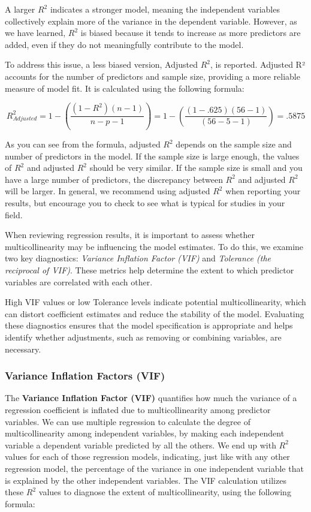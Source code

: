\documentclass[
  letterpaper,
  DIV=11,
  numbers=noendperiod]{scrreprt}
\begin{document}
A larger \(R^2\) indicates a stronger model, meaning the independent
variables collectively explain more of the variance in the dependent
variable. However, as we have learned, \(R^2\) is biased because it
tends to increase as more predictors are added, even if they do not
meaningfully contribute to the model.

To address this issue, a less biased version, Adjusted \(R^2\), is
reported. Adjusted R² accounts for the number of predictors and sample
size, providing a more reliable measure of model fit. It is calculated
using the following formula:

\[
R^2_{Adjusted} = 1 - \left( \frac{(1-R^2)(n-1)}{n-p-1} \right) 
= 1 - \left( \frac{(1- .625)(56-1)}{(56-5-1)} \right) = .5875
\]

As you can see from the formula, adjusted \(R^2\) depends on the sample
size and number of predictors in the model. If the sample size is large
enough, the values of \(R^2\) and adjusted \(R^2\) should be very
similar. If the sample size is small and you have a large number of
predictors, the discrepancy between \(R^2\) and adjusted \(R^2\) will be
larger. In general, we recommend using adjusted \(R^2\) when reporting
your results, but encourage you to check to see what is typical for
studies in your field.\,\,

When reviewing regression results, it is important to assess whether
multicollinearity may be influencing the model estimates. To do this, we
examine two key diagnostics: \emph{Variance Inflation Factor (VIF)} and
\emph{Tolerance (the reciprocal of VIF)}. These metrics help determine
the extent to which predictor variables are correlated with each other.

High VIF values or low Tolerance levels indicate potential
multicollinearity, which can distort coefficient estimates and reduce
the stability of the model. Evaluating these diagnostics ensures that
the model specification is appropriate and helps identify whether
adjustments, such as removing or combining variables, are necessary.

\subsubsection*{Variance Inflation Factors
(VIF)\,}\label{variance-inflation-factors-vif}

The \textbf{Variance Inflation Factor (VIF)} quantifies how much the
variance of a regression coefficient is inflated due to
multicollinearity among predictor variables. We can use multiple
regression to calculate the degree of multicollinearity among
independent variables, by making each independent variable a dependent
variable predicted by all the others. We end up with \(R^2\) values for
each of those regression models, indicating, just like with any other
regression model, the percentage of the variance in one independent
variable that is explained by the other independent variables. The VIF
calculation utilizes these \(R^2\) values to diagnose the extent of
multicollinearity, using the following formula:
\end{document}
